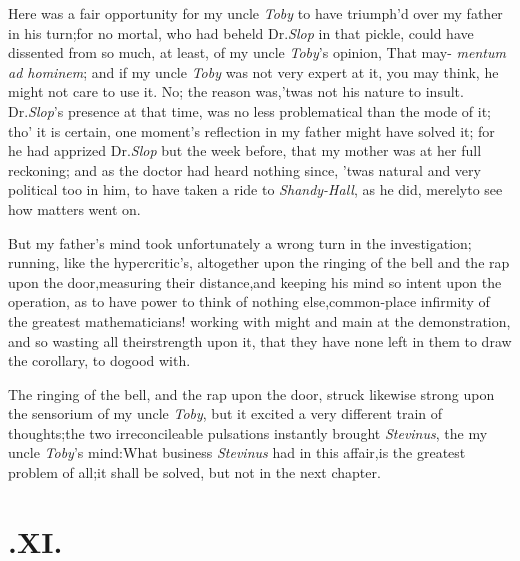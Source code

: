 \documentclass{article}
\begin{document}
Here was a fair opportunity for my uncle
\textit{Toby} to have triumph’d over my
father in his turn;\tsk for no mortal,
who had beheld Dr.\@ \textit{Slop} in
that pickle, could have dissented from
so much, at least, of my uncle
\textit{Toby}’s opinion, \lqq That may-\break
{}
\textit{mentum ad hominem}; and if my uncle
\textit{Toby} was not very expert at it,
you may think, he might not care to use
it.\tsk\break
No; the reason was,\tsk ’twas not his nature to insult.\\
\newpage
Dr.\@ \textit{Slop}’s presence at that time, was no less
problematical than the mode of it; tho’ it is certain, one
moment’s reflection in my father might have solved it; for he
had apprized Dr.\@ \textit{Slop} but the week before, that my mother was at her full reckoning;
and as the doctor had heard nothing since, ’twas natural and
very political too in him, to have taken a ride to
\textit{Shandy-Hall}, as he did, merely\break to see how matters went
on.

But my father’s mind took unfortunately a wrong turn in
the investigation; running, like the hypercritic’s,
altogether upon the ringing of the bell and the rap upon the
door,\tsk measuring their distance,\tsk and keeping his mind so
intent upon the operation, as to have power to think of nothing
else,\tsh common-place infirmity of the greatest
mathematicians! working with might and main at the
de\-monstration,
and so wasting all their\break strength upon it, that they have none left
in them to draw the corollary, to do\break good with.

The ringing of the bell, and the rap upon the door, struck
likewise strong\break
upon the sensorium of my uncle \textit{Toby},\tsk\break 
but it excited a very different train of
thoughts;\tsk the two irreconcileable pulsations instantly
brought \textit{Stevinus}, the\break
{}
my uncle \textit{Toby}’s mind:\tsk What business
\textit{Stevinus} had in this affair,\tsk is the greatest
problem of all;\tsh it shall be solved,\tsk\break
but not in the next chapter.

\vskip 30pt
\newpage

\section{.\enspace  XI.}
\end{document}
